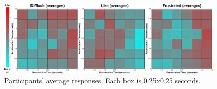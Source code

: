 \begin{figure}[!htb]
\centering
\includegraphics[width=0.97\textwidth]{Pics/Classes/averages/difficult_like_frustration_avg}
\caption{Participants' average responses. Each box is 0.25x0.25 seconds.}
\label{fig:difficult_like_frustration_avg}
\end{figure}



